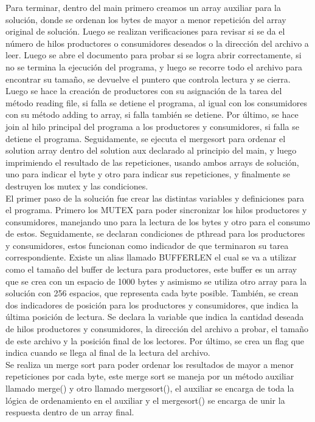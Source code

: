 \documentclass[12pt, article, natbib]{IEEEtran}
\begin{document}
Para terminar, dentro del main primero creamos un array auxiliar para la solución, donde se ordenan los bytes de mayor a menor repetición del array original de solución. Luego se realizan verificaciones para revisar si se da el número de hilos productores o consumidores deseados o la dirección del archivo a leer. Luego se abre el documento para probar si se logra abrir correctamente, si no se termina la ejecución del programa, y luego se recorre todo el archivo para encontrar su tamaño, se devuelve el puntero que controla lectura y se cierra. Luego se hace la creación de productores con su asignación de la tarea del método reading file, si falla se detiene el programa, al igual con los consumidores con su método adding to array, si falla también se detiene. Por último, se hace join al hilo principal del programa a los productores y consumidores, si falla se detiene el programa.\cite{kerrisk_2010_pthread_join3} Seguidamente, se ejecuta el mergesort para ordenar el solution array dentro del solution aux declarado al principio del main, y luego imprimiendo el resultado de las repeticiones, usando ambos arrays de solución, uno para indicar el byte y otro para indicar sus repeticiones, y finalmente se destruyen los mutex y las condiciones.\\
El primer paso de la solución fue crear las distintas variables y definiciones para el programa. Primero los MUTEX para poder sincronizar los hilos productores y consumidores, manejando uno para la lectura de los bytes y otro para el consumo de estos.\cite{cppdev_2010_c} \cite{manrow_2011_c} Seguidamente, se declaran condiciones de pthread para los productores y consumidores, estos funcionan como indicador de que terminaron su tarea correspondiente.\cite{theopengroup_1997_pthread_cond_wait} Existe un alias llamado BUFFERLEN el cual se va a utilizar como el tamaño del buffer de lectura para productores, este buffer es un array que se crea con un espacio de 1000 bytes y asimismo se utiliza otro array para la solución con 256 espacios, que representa cada byte posible. También, se crean dos indicadores de posición para los productores y consumidores, que indica la última posición de lectura. Se declara la variable que indica la cantidad deseada de hilos productores y consumidores, la dirección del archivo a probar, el tamaño de este archivo y la posición final de los lectores. Por último, se crea un flag que indica cuando se llega al final de la lectura del archivo.\\

Se realiza un merge sort para poder ordenar los resultados de mayor a menor repeticiones por cada byte, este merge sort se maneja por un método auxiliar llamado merge() y otro llamado mergesort(), el auxiliar se encarga de toda la lógica de ordenamiento en el auxiliar y el mergesort() se encarga de unir la respuesta dentro de un array final.\\
\end{document}
